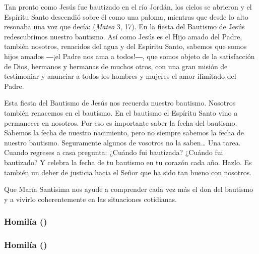 Tan pronto como Jesús fue bautizado en el río Jordán, los cielos se abrieron y el Espíritu Santo descendió sobre él como una paloma, mientras que desde lo alto resonaba una voz que decía:  (\emph{Mateo} 3, 17). En la fiesta del Bautismo de Jesús redescubrimos nuestro bautismo. Así como Jesús es el Hijo amado del Padre, también nosotros, renacidos del agua y del Espíritu Santo, sabemos que somos hijos amados ―¡el Padre nos ama a todos!―, que somos objeto de la satisfacción de Dios, hermanos y hermanas de muchos otros, con una gran misión de testimoniar y anunciar a todos los hombres y mujeres el amor ilimitado del Padre.

Esta fiesta del Bautismo de Jesús nos recuerda nuestro bautismo. Nosotros también renacemos en el bautismo. En el bautismo el Espíritu Santo vino a permanecer en nosotros. Por eso es importante saber la fecha del bautismo. Sabemos la fecha de nuestro nacimiento, pero no siempre sabemos la fecha de nuestro bautismo. Seguramente algunos de vosotros no la saben\ldots{} Una tarea. Cuando regreses a casa pregunta: ¿Cuándo fui bautizada? ¿Cuándo fui bautizado? Y celebra la fecha de tu bautismo en tu corazón cada año. Hazlo. Es también un deber de justicia hacia el Señor que ha sido tan bueno con nosotros.

Que María Santísima nos ayude a comprender cada vez más el don del bautismo y a vivirlo coherentemente en las situaciones cotidianas.

\subsubsection{Homilía ()}

\subsubsection{Homilía ()}
